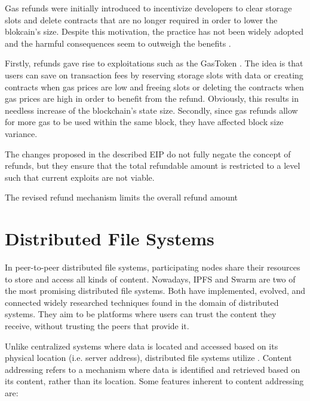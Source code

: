 Gas refunds were initially introduced to incentivize developers to clear storage slots and delete contracts that are no longer required in order to lower the blokcain's size. Despite this motivation, the practice has not been widely adopted and the harmful consequences seem to outweigh the benefits \citep{buterin_eip_3529}.

Firstly, refunds gave rise to exploitations such as the GasToken \citep{gastokenproject_2018}. The idea is that users can save on transaction fees by reserving storage slots with data or creating contracts when gas prices are low and freeing slots or deleting the contracts when gas prices are high in order to benefit from the refund. Obviously, this results in needless increase of the blockchain's state size. Secondly, since gas refunds allow for more gas to be used within the same block, they have affected block size variance.

The changes proposed in the described EIP do not fully negate the concept of refunds, but they ensure that the total refundable amount is restricted to a level such that current exploits are not viable.

The revised refund mechanism limits the overall refund amount
\section{Distributed File Systems}\label{sec:dfs}
In peer-to-peer distributed file systems, participating nodes share their resources to store and access all kinds of content. Nowadays, IPFS and Swarm are two of the most promising distributed file systems. Both have implemented, evolved, and connected widely researched techniques found in the domain of distributed systems. They aim to be platforms where users can trust the content they receive, without trusting the peers that provide it.

Unlike centralized systems where data is located and accessed based on its physical location (i.e. server address), distributed file systems utilize . Content addressing \citep{trautwein_2022} refers to a mechanism where data is identified and retrieved based on its content, rather than its location. Some features inherent to content addressing are:

